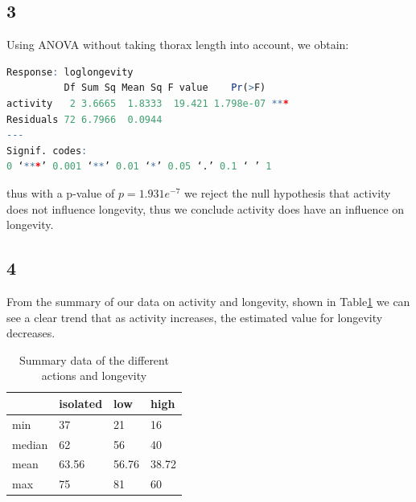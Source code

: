 \documentclass{article}
\begin{document}
    \subsection*{3}
      Using ANOVA without taking thorax length into account, we obtain:
            \begin{lstlisting}[language=R]
Response: loglongevity
          Df Sum Sq Mean Sq F value    Pr(>F)    
activity   2 3.6665  1.8333  19.421 1.798e-07 ***
Residuals 72 6.7966  0.0944                      
---
Signif. codes:  
0 ‘***’ 0.001 ‘**’ 0.01 ‘*’ 0.05 ‘.’ 0.1 ‘ ’ 1     
      \end{lstlisting}
      thus with a p-value of $p=1.931e^{-7}$ we reject the null hypothesis that activity does not influence longevity, thus we conclude activity does have an influence on longevity.

    \subsection*{4}
      From the summary of our data on activity and longevity, shown in Table\ref{table:SumAction} we can see a clear trend that as activity increases, the estimated value for longevity decreases.
      \begin{table}[H]
      \begin{center}
      \begin{tabular}{l|lll}
          \hline
                  & isolated& low & high \\
          \hline
          min     & 37      & 21  & 16 \\
          median  & 62      & 56  & 40 \\
          mean    & 63.56   & 56.76 & 38.72  \\
          max     & 75      & 81  & 60 \\
          \hline
      \end{tabular}
      \caption{Summary data of the different actions and longevity}
      \label{table:SumAction}
      \end{center}
      \end{table}
      
\end{document}
